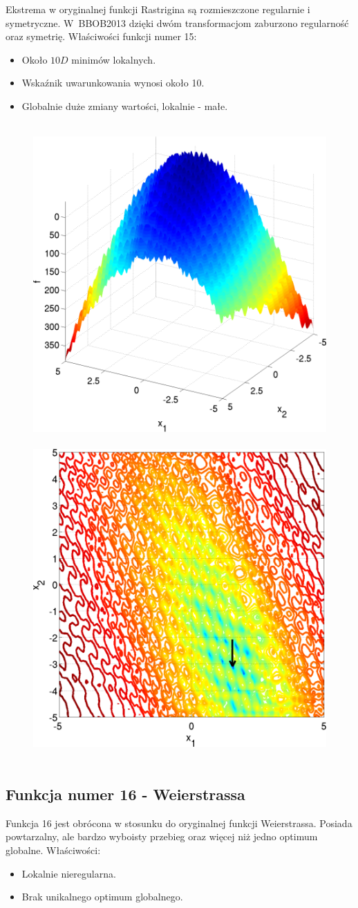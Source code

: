 \documentclass[a4paper,onecolumn,oneside,11pt,wide,floatssmall]{mwrep}
\theoremstyle{definition}
\theoremstyle{plain}%
\theoremstyle{remark}
\begin{document}
Ekstrema w oryginalnej funkcji Rastrigina są rozmieszczone regularnie i symetryczne. W~BBOB2013 dzięki dwóm transformacjom
zaburzono regularność oraz symetrię. Właściwości funkcji numer 15: 
\begin{itemize}
 \item Około $10D$ minimów lokalnych.
 \item Wskaźnik uwarunkowania wynosi około 10.
 \item Globalnie duże zmiany wartości, lokalnie - małe.
\end{itemize} 

\begin{figure}[H]
\centering
\mbox{
\includegraphics[width=.45\textwidth]{img/15.png} \quad
\includegraphics[width=.45\textwidth]{img/15a.png} 
}
\end{figure}

\subsection{Funkcja numer 16 - Weierstrassa}

Funkcja 16 jest obrócona w stosunku do oryginalnej funkcji Weierstrassa. 
Posiada powtarzalny, ale bardzo wyboisty przebieg oraz więcej niż jedno optimum globalne. Właściwości:
\begin{itemize}
 \item Lokalnie nieregularna.
 \item Brak unikalnego optimum globalnego.
\end{itemize} 
\end{document}
